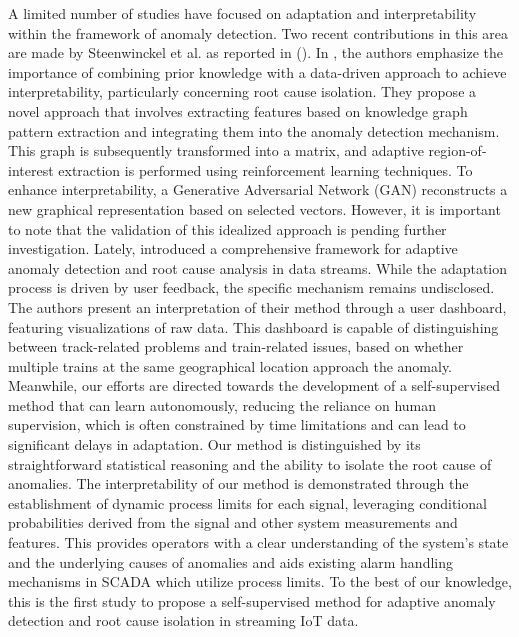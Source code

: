 A limited number of studies have focused on adaptation and interpretability within the framework of anomaly detection. Two recent contributions in this area are made by Steenwinckel et al. as reported in (\cite{Steenwinckel2018, Steenwinckel2021}). In \cite{Steenwinckel2018}, the authors emphasize the importance of combining prior knowledge with a data-driven approach to achieve interpretability, particularly concerning root cause isolation. They propose a novel approach that involves extracting features based on knowledge graph pattern extraction and integrating them into the anomaly detection mechanism. This graph is subsequently transformed into a matrix, and adaptive region-of-interest extraction is performed using reinforcement learning techniques. To enhance interpretability, a Generative Adversarial Network (GAN) reconstructs a new graphical representation based on selected vectors. However, it is important to note that the validation of this idealized approach is pending further investigation. Lately, \cite{Steenwinckel2021} introduced a comprehensive framework for adaptive anomaly detection and root cause analysis in data streams. While the adaptation process is driven by user feedback, the specific mechanism remains undisclosed. The authors present an interpretation of their method through a user dashboard, featuring visualizations of raw data. This dashboard is capable of distinguishing between track-related problems and train-related issues, based on whether multiple trains at the same geographical location approach the anomaly. Meanwhile, our efforts are directed towards the development of a self-supervised method that can learn autonomously, reducing the reliance on human supervision, which is often constrained by time limitations and can lead to significant delays in adaptation. Our method is distinguished by its straightforward statistical reasoning and the ability to isolate the root cause of anomalies. The interpretability of our method is demonstrated through the establishment of dynamic process limits for each signal, leveraging conditional probabilities derived from the signal and other system measurements and features. This provides operators with a clear understanding of the system's state and the underlying causes of anomalies and aids existing alarm handling mechanisms in SCADA which utilize process limits. To the best of our knowledge, this is the first study to propose a self-supervised method for adaptive anomaly detection and root cause isolation in streaming IoT data.

